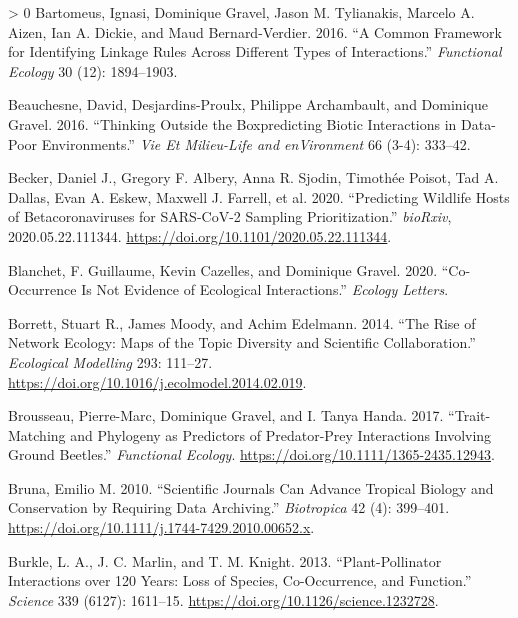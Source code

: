 \documentclass[10pt,oneside]{article}
\newlength{\cslhangindent}
\newenvironment{CSLReferences}[3] %
 {%
  \setlength{\parindent}{0pt}
  \ifodd #1 \everypar{\setlength{\hangindent}{\cslhangindent}}\ignorespaces\fi
  \ifnum #2 > 0
  \setlength{\parskip}{#2\baselineskip}
  \fi
 }%
 {}
\begin{document}
\begin{CSLReferences}{1}{0}
\leavevmode\hypertarget{ref-Bartomeus2016ComFra}{}%
Bartomeus, Ignasi, Dominique Gravel, Jason M. Tylianakis, Marcelo A.
Aizen, Ian A. Dickie, and Maud Bernard-Verdier. 2016. {``A Common
Framework for Identifying Linkage Rules Across Different Types of
Interactions.''} \emph{Functional Ecology} 30 (12): 1894--1903.

\leavevmode\hypertarget{ref-Beauchesne2016ThiOut}{}%
Beauchesne, David, Desjardins-Proulx, Philippe Archambault, and
Dominique Gravel. 2016. {``Thinking Outside the Boxpredicting Biotic
Interactions in Data-Poor Environments.''} \emph{Vie Et Milieu-Life and
enVironment} 66 (3-4): 333--42.

\leavevmode\hypertarget{ref-Becker2020PreWil}{}%
Becker, Daniel J., Gregory F. Albery, Anna R. Sjodin, Timothée Poisot,
Tad A. Dallas, Evan A. Eskew, Maxwell J. Farrell, et al. 2020.
{``Predicting Wildlife Hosts of Betacoronaviruses for SARS-CoV-2
Sampling Prioritization.''} \emph{bioRxiv}, 2020.05.22.111344.
\url{https://doi.org/10.1101/2020.05.22.111344}.

\leavevmode\hypertarget{ref-Blanchet2020CooNot}{}%
Blanchet, F. Guillaume, Kevin Cazelles, and Dominique Gravel. 2020.
{``Co-Occurrence Is Not Evidence of Ecological Interactions.''}
\emph{Ecology Letters}.

\leavevmode\hypertarget{ref-Borrett2014RisNet}{}%
Borrett, Stuart R., James Moody, and Achim Edelmann. 2014. {``The Rise
of Network Ecology: Maps of the Topic Diversity and Scientific
Collaboration.''} \emph{Ecological Modelling} 293: 111--27.
\url{https://doi.org/10.1016/j.ecolmodel.2014.02.019}.

\leavevmode\hypertarget{ref-Brousseau2017TraPhy}{}%
Brousseau, Pierre-Marc, Dominique Gravel, and I. Tanya Handa. 2017.
{``Trait-Matching and Phylogeny as Predictors of Predator-Prey
Interactions Involving Ground Beetles.''} \emph{Functional Ecology}.
\url{https://doi.org/10.1111/1365-2435.12943}.

\leavevmode\hypertarget{ref-Bruna2010SciJou}{}%
Bruna, Emilio M. 2010. {``Scientific Journals Can Advance Tropical
Biology and Conservation by Requiring Data Archiving.''}
\emph{Biotropica} 42 (4): 399--401.
\url{https://doi.org/10.1111/j.1744-7429.2010.00652.x}.

\leavevmode\hypertarget{ref-Burkle2013PlaInt}{}%
Burkle, L. A., J. C. Marlin, and T. M. Knight. 2013. {``Plant-Pollinator
Interactions over 120 Years: Loss of Species, Co-Occurrence, and
Function.''} \emph{Science} 339 (6127): 1611--15.
\url{https://doi.org/10.1126/science.1232728}.


\end{CSLReferences}
\end{document}
